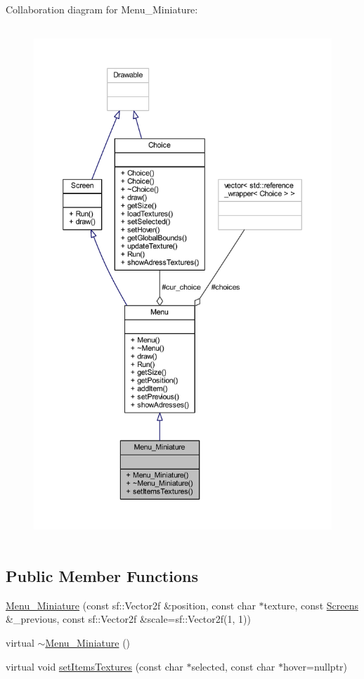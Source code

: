 Collaboration diagram for Menu\+\_\+\+Miniature\+:\nopagebreak
\begin{figure}[H]
\begin{center}
\leavevmode
\includegraphics[height=550pt]{class_menu___miniature__coll__graph}
\end{center}
\end{figure}
\subsection*{Public Member Functions}
\begin{DoxyCompactItemize}
\item 
\hyperlink{class_menu___miniature_a9bc0436adab538cddc4074003d324a82}{Menu\+\_\+\+Miniature} (const sf\+::\+Vector2f \&position, const char $\ast$texture, const \hyperlink{_globals_8h_a3d5776bab98402b03be09156bacf4f68}{Screens} \&\+\_\+previous, const sf\+::\+Vector2f \&scale=sf\+::\+Vector2f(1, 1))
\item 
virtual \hyperlink{class_menu___miniature_a6893bda2d8bc8f29ac0646e976082515}{$\sim$\+Menu\+\_\+\+Miniature} ()
\item 
virtual void \hyperlink{class_menu___miniature_afad04c066c7e436bbf9cccde310d07dc}{set\+Items\+Textures} (const char $\ast$selected, const char $\ast$hover=nullptr)
\end{DoxyCompactItemize}
